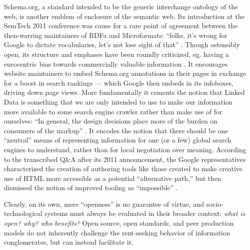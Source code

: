 Schema.org, a standard intended to be the generic interchange ontology
of the web, is another emblem of enclosure of the semantic web. Its
introduction at the SemTech 2011 conference was cause for a rare point
of agreement between the then-warring maintainers of RDFa and Microformats:
``folks, it's wrong for Google to dictate vocabularies, let's not lose
sight of that'' \cite{SemTech2011BOF2011} . Though ostensibly
open, its structure and emphases have been roundly criticized, eg.
having a eurocentric bias towards commercially valuable information \cite{iliadisOneSchemaRule2023} . It encourages website maintainers to
embed Schema.org annotations in their pages in exchange for a boost in
search rankings --- which Google then embeds in its infoboxes, driving
down page views. More fundamentally it cements the notion that Linked
Data is something that we are only intended to use to make our
information more available to some search engine crawler rather than
make use of for ourselves: ``In general, the design decisions place more
of the burden on consumers of the markup'' \cite{guhaSchemaOrgEvolution2015} . It encodes the notion that there should
be one ``neutral'' means of representing information for one (or a few)
global search engines to understand, rather than for local negotiation
over meaning. According to the transcribed Q\&A after its 2011
announcement, the Google representatives characterized the creation of
authoring tools like those created to make creative use of HTML more
accessible as a potential ``alternative path,'' but then dismissed the
notion of improved tooling as ``impossible'' \cite{hawkeNotesSessionSemTech2011} .

Clearly, on its own, mere ``openness'' is no guarantee of virtue, and
socio-technological systems must always be evaluated in their broader
context: \emph{what is open? why? who benefits?} Open source, open
standards, and peer production models do not inherently challenge the
rent-seeking behavior of information conglomerates, but can instead
facilitate it.

